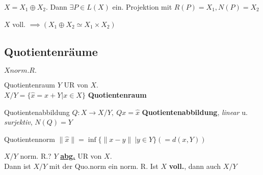 \begin{lemma}
  $X = X_1 \oplus X_2$. Dann $\exists P \in L(X)$ ein. Projektion mit
  $R(P) = X_1, N(P) = X_2$
\end{lemma}

\begin{bemerkung}
  $X$ voll. $\implies (X_1 \oplus X_2 \simeq X_1 \times X_2)$
\end{bemerkung}


\subsection{Quotientenräume}
$X norm. R.$

\begin{definition}{Quotientenraum}
  $Y$ UR von $X$.\\
  $X/Y = \{\hat{x} = x + Y| x\in X\}$ \textbf{Quotientenraum}
\end{definition}

\begin{definition}{Quotientenabbildung}
  $Q:X \to X/Y,\ Qx = \hat{x}$ \textbf{Quotientenabbildung},
  \textit{linear} u. \textit{surjektiv}, $N(Q) = Y$
\end{definition}

\begin{definition}{Quotientennorm}
  $\|\hat{x}\| = \inf\{\|x-y\|\ |y\in Y \} (= d(x,Y))$
\end{definition}

\begin{satz}{$X/Y$ norm. R.?}
  $Y$ \textbf{\uline{abg.}} UR von $X$.\\
  Dann ist $X/Y$ mit der Quo.norm ein norm. R. Ist $X$ \textbf{voll.}, dann
  auch $X/Y$
\end{satz}
